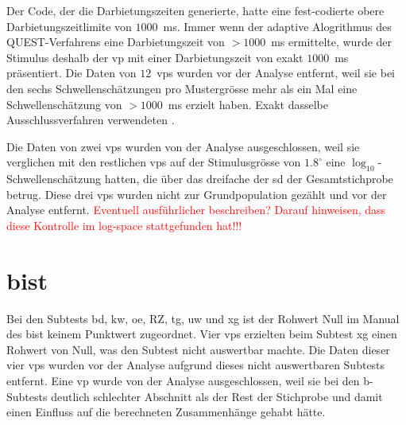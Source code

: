 \documentclass[11pt, twoside, a4paper]{book}		%
\begin{document}
Der Code, der die Darbietungszeiten generierte, hatte eine fest-codierte obere Darbietungszeitlimite von $1000$~ms. Immer wenn der adaptive Alogrithmus des QUEST-Verfahrens \citep{Watson1983} eine Darbietungszeit von $> 1000$~ms ermittelte, wurde der Stimulus deshalb der \gls{vp}  mit einer Darbietungszeit von exakt $1000$~ms präsentiert. 
Die Daten von $12$~\glspl{vp} wurden vor der Analyse entfernt, weil sie bei den sechs Schwellenschätzungen pro Mustergrösse mehr als ein Mal eine Schwellenschätzung von $> 1000$~ms erzielt haben. Exakt dasselbe Ausschlussverfahren verwendeten \citet{Melnick2013}.

Die Daten von zwei \glspl{vp} wurden von der Analyse ausgeschlossen, weil sie verglichen mit den restlichen \glspl{vp} auf der Stimulusgrösse von $1.8^{\circ}$ eine $\log_{10}$-Schwel\-len\-schätz\-ung hatten, die über das dreifache der \gls{sd} der Gesamtstichprobe betrug. Diese drei \glspl{vp} wurden nicht zur Grundpopulation gezählt und vor der Analyse entfernt. \textcolor{red}{Eventuell ausführlicher beschreiben? Darauf hinweisen, dass diese Kontrolle im log-space stattgefunden hat!!!}


\section{\gls{bist}}
Bei den Subtests \gls{bd}, \gls{kw}, \gls{oe}, \gls{RZ}, \gls{tg}, \gls{uw} und \gls{xg} ist der Rohwert Null im Manual des \gls{bist} keinem Punktwert zugeordnet. Vier \glspl{vp} erzielten beim Subtest \gls{xg} einen Rohwert von Null, was den Subtest nicht auswertbar machte. Die Daten dieser vier \glspl{vp} wurden vor der Analyse aufgrund dieses nicht auswertbaren Subtests entfernt. Eine \gls{vp} wurde von der Analyse ausgeschlossen, weil sie bei den \gls{b}-Subtests deutlich schlechter Abschnitt als der Rest der Stichprobe und damit einen Einfluss auf die berechneten Zusammenhänge gehabt hätte.
\end{document}
